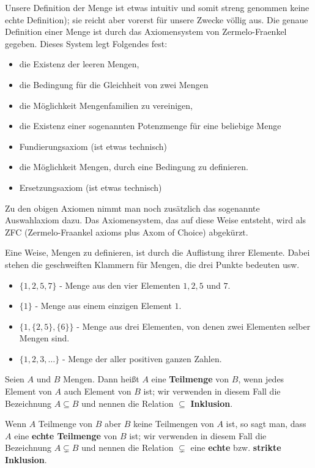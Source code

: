 \begin{bem}
	Unsere Definition der Menge ist etwas intuitiv und  somit streng genommen keine echte Definition); sie reicht aber vorerst für unsere Zwecke völlig aus. Die genaue Definition einer Menge ist durch das Axiomensystem von Zermelo-Fraenkel gegeben. Dieses System legt Folgendes fest: 
	\begin{itemize}
		\item die Existenz der leeren Mengen, 
		\item die Bedingung für die Gleichheit von zwei Mengen
		\item die Möglichkeit Mengenfamilien zu vereinigen, 
		\item die Existenz einer sogenannten Potenzmenge für eine beliebige Menge
		\item Fundierungsaxiom (ist etwas technisch)
		\item die Möglichkeit Mengen, durch eine Bedingung zu definieren. 
		\item Ersetzungsaxiom (ist etwas technisch)
	\end{itemize} 
	Zu den obigen Axiomen nimmt man noch zusätzlich das sogenannte Auswahlaxiom dazu. Das Axiomensystem, das auf diese Weise entsteht, wird als ZFC (Zermelo-Fraankel axioms plus Axom of Choice) abgekürzt. 
\end{bem} 


\begin{bsp} 
Eine Weise, Mengen zu definieren, ist durch die Auflistung ihrer Elemente. Dabei stehen die geschweiften Klammern für Mengen, die drei Punkte bedeuten \glqq usw\grqq.
\begin{itemize}
	\item $ \{1,2,5,7\} $ - Menge aus den vier Elementen $1,2,5$ und $7$. 
	\item $ \{1\} $ - Menge aus einem einzigen Element $1$. 
	\item $ \{1,\{2,5\},\{6\}\} $ - Menge aus drei Elementen, von denen zwei Elementen selber Mengen sind. 
	\item $ \{1,2,3,\ldots\} $ - Menge der aller positiven ganzen Zahlen. 
\end{itemize}
\end{bsp}

\begin{defn}
Seien $ A $ und $ B $ Mengen. Dann heißt $ A $ eine \textbf{Teilmenge} von $ B $, wenn jedes Element von $ A $ auch Element von $ B $ ist;  wir verwenden in diesem Fall die Bezeichnung $A \subseteq B$ und nennen die Relation $\subseteq$ \textbf{Inklusion}. 

Wenn $A$ Teilmenge von $B$ aber $B$ keine Teilmengen von $A$ ist, so sagt man, dass $A$ eine \textbf{echte Teilmenge} von $B$ ist; wir verwenden in diesem Fall die Bezeichnung $A \varsubsetneq B$ und nennen die Relation $\varsubsetneq$ eine \textbf{echte} bzw. \textbf{strikte Inklusion}. 
\end{defn}

